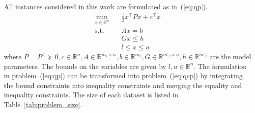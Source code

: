 \documentclass[10pt]{article} %
\begin{document}
All instances considered in this work are formulated as in~(\ref{eq:qp}).
\begin{equation}
\label{eq:qp}
\begin{aligned}
    \underset{x\in\mathbb{R}^n}{\min} \quad & \frac{1}{2} x^\top P x + c^\top x \\
    \text{s.t.} \quad & Ax = b \\
    & Gx \leq h \\
    & l \leq x \leq u
\end{aligned}
\end{equation}
where $P=P^\top \succeq 0, c\in\mathbb{R}^n, A\in \mathbb{R}^{m_1\times n}, b\in\mathbb{R}^{m_1}, G\in \mathbb{R}^{m'_2\times n}, h\in\mathbb{R}^{m'_2}$ are the model parameters. The bounds on the variables are given by $l, u\in \mathbb{R}^n$. 
The formulation in problem~(\ref{eq:qp}) can be transformed into problem~(\ref{eq:qcp}) by integrating the bound constraints into inequality constraints and merging the equality and inequality constraints.
The size of each dataset is listed in Table~\ref{tab:problem_size}.

\begin{table}[h]
\caption{Problem sizes}
\label{tab:problem_size}
\begin{center}
\end{center}
\end{table}
\end{document}
